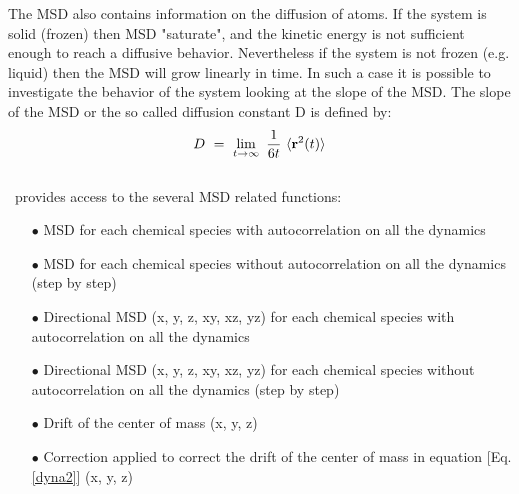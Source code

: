 The MSD also contains information on the diffusion of atoms. 
If the system is solid (frozen) then MSD "saturate", and the kinetic energy is not sufficient enough to reach a diffusive behavior. 
Nevertheless if the system is not frozen (e.g. liquid) then the MSD will grow linearly in time. 
In such a case it is possible to investigate the behavior of the system looking at the slope of the MSD. The slope of the MSD or the so called diffusion constant D is defined by:
\begin{equation}
\label{dyna3}
D\ =\ \lim_{t \to \infty}\ \frac{1}{6t}\ \langle {\bf{r}}^{2}(t) \rangle
\end{equation}
\\
\atomes\ provides access to the several MSD related functions:
\begin{itemize}
\item[$\bullet$] MSD for each chemical species with autocorrelation on all the dynamics
\item[$\bullet$] MSD for each chemical species without autocorrelation on all the dynamics (step by step)
\item[$\bullet$] Directional MSD (x, y, z, xy, xz, yz) for each chemical species with autocorrelation on all the dynamics
\item[$\bullet$] Directional MSD (x, y, z, xy, xz, yz) for each chemical species without autocorrelation on all the dynamics (step by step)
\item[$\bullet$] Drift of the center of mass (x, y, z)
\item[$\bullet$] Correction applied to correct the drift of the center of mass in equation [Eq. \ref{dyna2}] (x, y, z)
\end{itemize}
